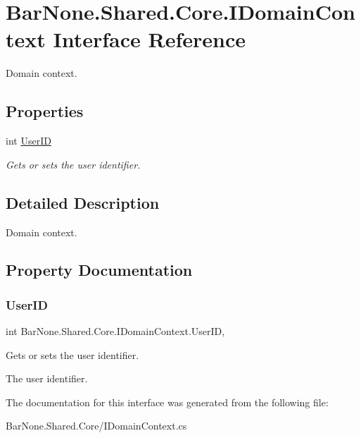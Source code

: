 \hypertarget{interface_bar_none_1_1_shared_1_1_core_1_1_i_domain_context}{}\section{Bar\+None.\+Shared.\+Core.\+I\+Domain\+Context Interface Reference}
\label{interface_bar_none_1_1_shared_1_1_core_1_1_i_domain_context}


Domain context.  


\subsection*{Properties}
\begin{DoxyCompactItemize}
\item 
int \mbox{\hyperlink{interface_bar_none_1_1_shared_1_1_core_1_1_i_domain_context_a137bbc7e6c245019f9db3b885da1c23f}{User\+ID}}
\begin{DoxyCompactList}\small\item\em Gets or sets the user identifier. \end{DoxyCompactList}\end{DoxyCompactItemize}


\subsection{Detailed Description}
Domain context. 



\subsection{Property Documentation}
\mbox{\label{interface_bar_none_1_1_shared_1_1_core_1_1_i_domain_context_a137bbc7e6c245019f9db3b885da1c23f}} 
\subsubsection{\texorpdfstring{User\+ID}{UserID}}
{\footnotesize\ttfamily int Bar\+None.\+Shared.\+Core.\+I\+Domain\+Context.\+User\+ID\hspace{0.3cm}{\ttfamily [get]}, {\ttfamily [set]}}



Gets or sets the user identifier. 

The user identifier. 

The documentation for this interface was generated from the following file\+:\begin{DoxyCompactItemize}
\item 
Bar\+None.\+Shared.\+Core/I\+Domain\+Context.\+cs\end{DoxyCompactItemize}
